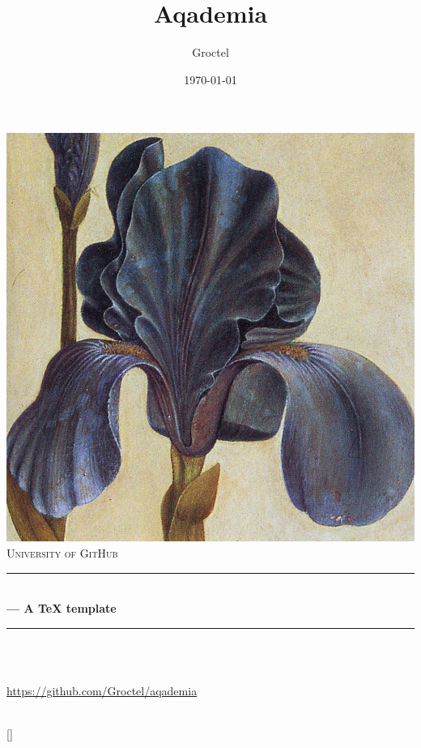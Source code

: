 \documentclass[10pt]{report}
\title{Aqademia}
\author{Groctel}
\date{\today}
\newcommand\thesubtitle{ --- A TeX template}
\newcommand\theorganization{University of GitHub}
\newcommand\therepository{\url{https://github.com/Groctel/aqademia}}
\begin{document}

\begin{titlepage}
	\begin{center}
			  \includegraphics[scale = 0.75]{titlepage.png}\\[0.5cm]

		\textsc{\Huge\theorganization}\\
		\rule{\linewidth}{0.2 mm}\\[0.3 cm]
			{\huge\bfseries\thetitle\thesubtitle}\\
		\rule{\linewidth}{0.2 mm}\\[1 cm]

		\vfill

		\Large{\textbf{\theauthor}}\\[0.1cm]
		\large{\therepository}\\[0.5 cm]
		{\large \thedate}\\[1.5 cm]
	\end{center}

	{\doclicenseThis}
\end{titlepage}

\tableofcontents



\setcounter{chapter}{0}
[]
\renewcommand{\thesubsection}{\MakeUppercase{\alph{chapter}}.\arabic{subsection}}
\end{document}
